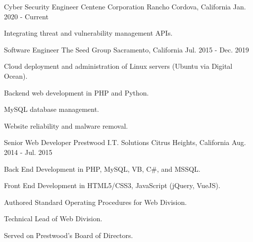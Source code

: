 

\begin{cventries}

  \cventry
    {Cyber Security Engineer} %
    {Centene Corporation} %
    {Rancho Cordova, California} %
    {Jan. 2020 - Current} %
    {
      \begin{cvitems} %
        \item {Integrating threat and vulnerability management APIs.}
      \end{cvitems}
    }



  \cventry
    {Software Engineer} %
    {The Seed Group} %
    {Sacramento, California} %
    {Jul. 2015 - Dec. 2019} %
    {
      \begin{cvitems} %
        \item {Cloud deployment and administration of Linux servers (Ubuntu via Digital Ocean).}
        \item {Backend web development in PHP and Python.}
        \item {MySQL database management.}
        \item {Website reliability and malware removal.}
      \end{cvitems}
    }


  \cventry
    {Senior Web Developer} %
    {Prestwood I.T. Solutions} %
    {Citrus Heights, California} %
    {Aug. 2014 - Jul. 2015} %
    {
      \begin{cvitems} %
        \item {Back End Development in PHP, MySQL, VB, C\#, and MSSQL.}
        \item {Front End Development in HTML5/CSS3, JavaScript (jQuery, VueJS). }
        \item {Authored Standard Operating Procedures for Web Division.}
        \item {Technical Lead of Web Division.}
        \item {Served on Prestwood's Board of Directors.}
      \end{cvitems}
    }


\end{cventries}
